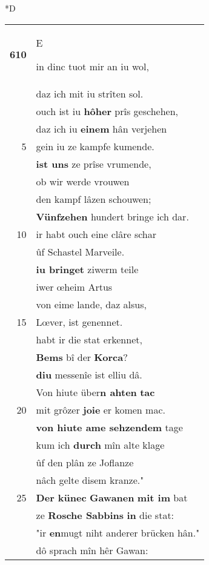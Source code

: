 \documentclass[8pt,a4paper,notitlepage]{article}
\begin{document}
\begin{table}[ht]
\begin{minipage}[t]{0.5\linewidth}
\small
\begin{center}*D
\end{center}
\begin{tabular}{rl}
\textbf{610} & \begin{large}E\end{large}in dinc tuot mir an iu wol,\\ 
 & daz ich mit iu strîten sol.\\ 
 & ouch ist iu \textbf{hôher} prîs geschehen,\\ 
 & daz ich iu \textbf{einem} hân verjehen\\ 
5 & gein iu ze kampfe kumende.\\ 
 & \textbf{ist uns} ze prîse vrumende,\\ 
 & ob wir werde vrouwen\\ 
 & den kampf lâzen schouwen;\\ 
 & \textbf{Vünfzehen} hundert bringe ich dar.\\ 
10 & ir habt ouch eine clâre schar\\ 
 & ûf Schastel Marveile.\\ 
 & \textbf{iu bringet} ziwerm teile\\ 
 & iwer œheim Artus\\ 
 & von eime lande, daz alsus,\\ 
15 & Lœver, ist genennet.\\ 
 & habt ir die stat erkennet,\\ 
 & \textbf{Bems} bî der \textbf{Korca}?\\ 
 & \textbf{diu} messenîe ist elliu dâ.\\ 
 & Von hiute über\textbf{n ahten} \textbf{tac}\\ 
20 & mit grôzer \textbf{joie} er komen mac.\\ 
 & \textbf{von hiute ame sehzendem} tage\\ 
 & kum ich \textbf{durch} mîn alte klage\\ 
 & ûf den plân ze Joflanze\\ 
 & nâch gelte disem kranze."\\ 
25 & \textbf{Der künec} \textbf{Gawanen} \textbf{mit im} bat\\ 
 & ze \textbf{Rosche Sabbins} \textbf{in} die stat:\\ 
 & "ir \textbf{en}mugt niht anderer brücken hân."\\ 
 & dô sprach mîn hêr Gawan:\\ 

\end{tabular}
\end{minipage}
\end{table}
\end{document}
